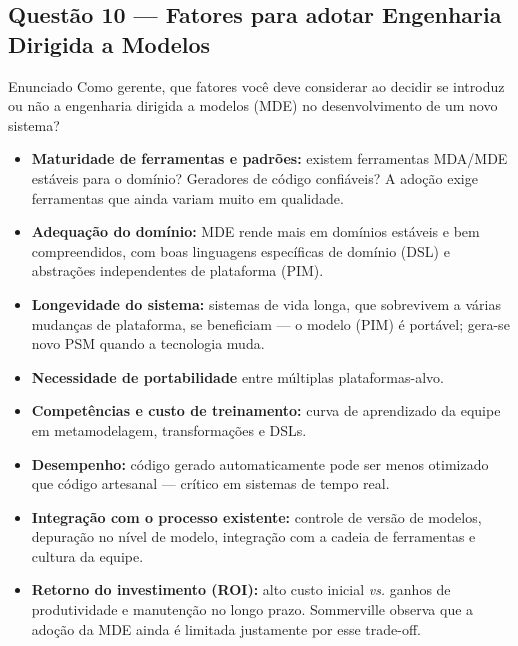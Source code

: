 \documentclass[11pt,a4paper]{article}
\begin{document}
\subsection*{Questão 10 — Fatores para adotar Engenharia Dirigida a Modelos}
\begin{questao}{Enunciado}
Como gerente, que fatores você deve considerar ao decidir se introduz ou não a
engenharia dirigida a modelos (MDE) no desenvolvimento de um novo sistema?
\end{questao}
\begin{resposta}
\begin{itemize}[nosep]
  \item \textbf{Maturidade de ferramentas e padrões:} existem ferramentas
        MDA/MDE estáveis para o domínio? Geradores de código confiáveis? A
        adoção exige ferramentas que ainda variam muito em qualidade.
  \item \textbf{Adequação do domínio:} MDE rende mais em domínios estáveis e bem
        compreendidos, com boas linguagens específicas de domínio (DSL) e
        abstrações independentes de plataforma (PIM).
  \item \textbf{Longevidade do sistema:} sistemas de vida longa, que sobrevivem a
        várias mudanças de plataforma, se beneficiam — o modelo (PIM) é portável;
        gera-se novo PSM quando a tecnologia muda.
  \item \textbf{Necessidade de portabilidade} entre múltiplas plataformas-alvo.
  \item \textbf{Competências e custo de treinamento:} curva de aprendizado da
        equipe em metamodelagem, transformações e DSLs.
  \item \textbf{Desempenho:} código gerado automaticamente pode ser menos
        otimizado que código artesanal — crítico em sistemas de tempo real.
  \item \textbf{Integração com o processo existente:} controle de versão de
        modelos, depuração no nível de modelo, integração com a cadeia de
        ferramentas e cultura da equipe.
  \item \textbf{Retorno do investimento (ROI):} alto custo inicial \emph{vs.}
        ganhos de produtividade e manutenção no longo prazo. Sommerville observa
        que a adoção da MDE ainda é limitada justamente por esse trade-off.
\end{itemize}
\end{resposta}
\end{document}
